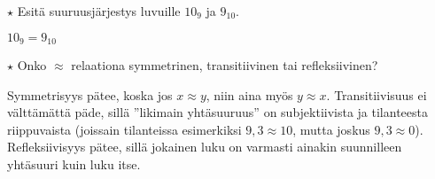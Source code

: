 \begin{tehtavasivu}
\begin{tehtava}
$\star$ Esitä suuruusjärjestys luvuille $10_9$ ja $9_{10}$.
	\begin{vastaus}
	$10_9=9_{10}$
	\end{vastaus}
\end{tehtava}

\begin{tehtava}
$\star$ Onko $\approx$ relaationa symmetrinen, transitiivinen tai refleksiivinen?
	\begin{vastaus}
Symmetrisyys pätee, koska jos $x\approx y$, niin aina myös $y\approx x$. Transitiivisuus ei välttämättä päde, sillä ''likimain yhtäsuuruus'' on subjektiivista ja tilanteesta riippuvaista (joissain tilanteissa esimerkiksi $9,3\approx 10$, mutta joskus $9,3 \approx 0$). Refleksiivisyys pätee, sillä jokainen luku on varmasti ainakin suunnilleen yhtäsuuri kuin luku itse.
	\end{vastaus}
\end{tehtava}

\end{tehtavasivu}